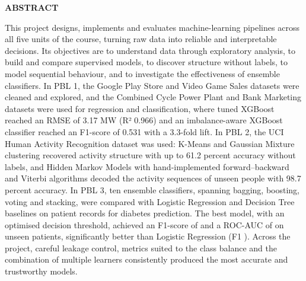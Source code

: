 {}
\begin{center}{\bfseries\fontsize{16}{20}\selectfont ABSTRACT}\end{center}
\vspace{6pt}
This project designs, implements and evaluates machine-learning pipelines across all five units of the course, turning
raw data into reliable and interpretable decisions. Its objectives are to understand data through exploratory analysis,
to build and compare supervised models, to discover structure without labels, to model sequential behaviour, and to
investigate the effectiveness of ensemble classifiers. In PBL 1, the Google Play Store and Video Game Sales datasets
were cleaned and explored, and the Combined Cycle Power Plant and Bank Marketing datasets were used for regression and
classification, where tuned XGBoost reached an RMSE of 3.17 MW (R² 0.966) and an imbalance-aware XGBoost classifier
reached an F1-score of 0.531 with a 3.3-fold lift. In PBL 2, the UCI Human Activity Recognition dataset was used:
K-Means and Gaussian Mixture clustering recovered activity structure with up to 61.2 percent accuracy without labels,
and Hidden Markov Models with hand-implemented forward–backward and Viterbi algorithms decoded the activity sequences
of unseen people with 98.7 percent accuracy. In PBL 3, ten ensemble classifiers, spanning bagging, boosting, voting and
stacking, were compared with Logistic Regression and Decision Tree baselines on \dbRowsClean{} patient records for
diabetes prediction. The best model, \dbBestName{} with an optimised decision threshold, achieved an F1-score of
\dbBestFone{} and a ROC-AUC of \dbBestAuc{} on unseen patients, significantly better than Logistic Regression (F1
\dbLrFone). Across the project, careful leakage control, metrics suited to the class balance and the combination of
multiple learners consistently produced the most accurate and trustworthy models.

